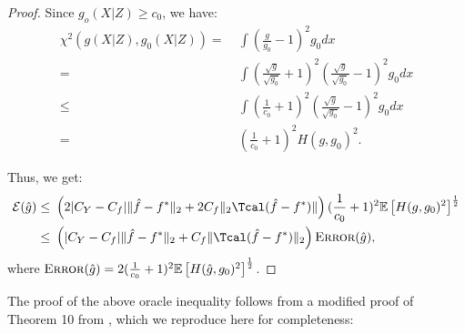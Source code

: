 \documentclass[12pt]{extarticle} %
\newcommand{\E}{\mathbb{E}}
\newcommand{\error}{\ensuremath{\textsc{Error}}}
\begin{document}
\begin{proof}
Since $g_o(X|Z)\geq c_0$, we have:
\begin{align*}
    \mathcal{\chi}^2(g(X|Z),g_0(X|Z)) =~&\int\left(\frac{g}{g_0}-1\right)^2g_0dx\\
    =~&\int\left(\frac{\sqrt{g}}{\sqrt{g_0}}+1\right)^2\left(\frac{\sqrt{g}}{\sqrt{g_0}}-1\right)^2g_0dx\\
    \leq~&\int\left(\frac{1}{c_0}+1\right)^2\left(\frac{\sqrt{g}}{\sqrt{g_0}}-1\right)^2g_0dx\\
    =~&\left(\frac{1}{c_0}+1\right)^2 H(g,g_0)^2.
\end{align*}

Thus, we get:
\begin{align*}
    {\cal E}(\hat{g}) \leq~& \left(2|C_Y-C_f|\|\hat{f}-f^*\|_{2}+2C_f\|_2\Tcal(\hat{f}-f^*)\|\right)(\frac{1}{c_0} + 1)^2\mathbb{E}\left[H(g,g_0)^2\right]^{\frac{1}{2}}\\
    \leq~& \left(|C_Y-C_f|\|\hat{f}-f^*\|_{2}+C_f\|\Tcal(\hat{f}-f^*)\|_2\right)\error(\hat{g}),
\end{align*} where $\error(\hat{g}) =2(\frac{1}{c_0} + 1)^2\mathbb{E}\left[H(\hat{g},g_0)^2\right]^{\frac{1}{2}}$.


\end{proof}

The proof of the above oracle inequality follows from a modified proof of Theorem 10 from \citet{lan2023causal}, which we reproduce here for completeness:
\end{document}
